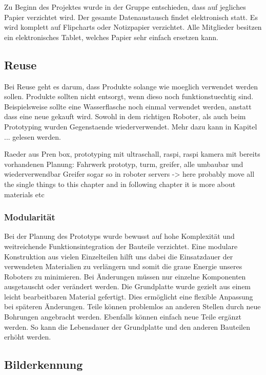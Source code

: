 
Zu Beginn des Projektes wurde in der Gruppe entschieden, dass auf jegliches Papier verzichtet wird. Der gesamte Datenaustausch findet elektronisch statt. Es wird komplett auf Flipcharts oder Notizpapier verzichtet. Alle Mitglieder besitzen ein elektronisches Tablet, welches Papier sehr einfach ersetzen kann.

\subsection{Reuse}

Bei Reuse geht es darum, dass Produkte solange wie moeglich verwendet werden sollen. Produkte sollten nicht entsorgt, wenn dieso noch funktionstuechtig sind. Beispielsweise sollte eine Wasserflasche noch einmal verwendet werden, anstatt dass eine neue gekauft wird. Sowohl in dem richtigen Roboter, als auch beim Prototyping wurden Gegenstaende wiederverwendet. Mehr dazu kann in Kapitel ... gelesen werden.

 Raeder aus Pren box, prototyping mit ultraschall, raspi, raspi kamera mit bereits vorhandenen
 Planung: Fahrwerk prototyp, turm, greifer, alle umbaubar und wiederverwendbar
 Greifer sogar so in roboter
 servers
-> here probably move all the single things to this chapter and in following chapter it is more about materials etc


\subsubsection{Modularität}
Bei der Planung des Prototyps wurde bewusst auf hohe Komplexität und weitreichende Funktionsintegration der Bauteile verzichtet. Eine modulare Konstruktion aus vielen Einzelteilen hilft uns dabei die Einsatzdauer der verwendeten Materialien zu verlängern und somit die graue Energie unseres Roboters zu minimieren. Bei Änderungen müssen nur einzelne Komponenten ausgetauscht oder verändert werden. Die Grundplatte wurde gezielt aus einem leicht bearbeitbaren Material gefertigt. Dies ermöglicht eine flexible Anpassung bei späteren Änderungen. Teile können problemlos an anderen Stellen durch  neue Bohrungen angebracht werden. Ebenfalls können einfach neue Teile ergänzt werden. So kann die Lebensdauer der Grundplatte und den anderen Bauteilen erhöht werden. 

\subsection{Bilderkennung}

